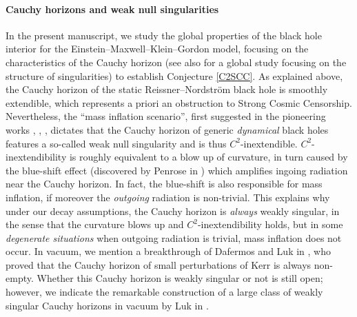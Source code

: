 \documentclass[10pt,a4paper]{article}
\theoremstyle{plain}
\theoremstyle{remark}
\theoremstyle{definition}
\theoremstyle{plain}
\theoremstyle{remark}
\theoremstyle{definition}
\numberwithin{equation}{section}
\begin{document}
 	\paragraph{Cauchy horizons and weak null singularities} In the present manuscript, we study the global properties of the black hole interior for the Einstein--Maxwell--Klein--Gordon model, focusing on the characteristics of the Cauchy horizon (see  also \cite{r=0} for a global study focusing on the structure of singularities) to establish Conjecture \ref{C2SCC}. As explained above, the Cauchy horizon of the static Reissner--Nordstr\"{o}m black hole is smoothly extendible, which represents a priori an obstruction to Strong Cosmic Censorship. Nevertheless, the ``mass inflation scenario'', first suggested in the pioneering works \cite{Ori}, \cite{Poisson}, \cite{PoissonIsrael}, dictates that the Cauchy horizon of generic \textit{dynamical} black holes features a so-called weak null singularity and is thus $C^2$-inextendible. $C^2$-inextendibility is roughly equivalent to a blow up of curvature, in turn caused by the blue-shift effect (discovered by Penrose in \cite{Penroseblue}) which amplifies ingoing radiation near the Cauchy horizon. In fact, the blue-shift is also responsible for mass inflation, if moreover the \textit{outgoing} radiation is non-trivial. This explains why under our decay assumptions, the Cauchy horizon is \textit{always} weakly singular, in the sense that the curvature blows up and $C^2$-inextendibility holds, but in some  \textit{degenerate situations} when outgoing radiation is trivial, mass inflation does not occur. In vacuum, we mention a breakthrough of Dafermos and Luk in \cite{KerrStab}, who proved that the Cauchy horizon of small perturbations of Kerr is always non-empty. Whether this Cauchy horizon is weakly singular or not is still open; however, we indicate the remarkable construction of a large class of weakly singular Cauchy horizons in vacuum by Luk in \cite{JonathanWeakNull}.
 	
 	
 
 	
\end{document}
